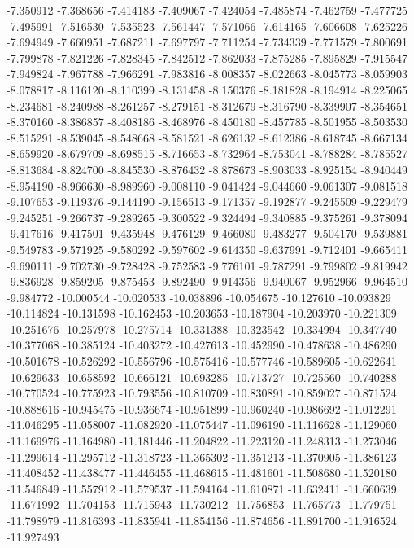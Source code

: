 -7.350912
-7.368656
-7.414183
-7.409067
-7.424054
-7.485874
-7.462759
-7.477725
-7.495991
-7.516530
-7.535523
-7.561447
-7.571066
-7.614165
-7.606608
-7.625226
-7.694949
-7.660951
-7.687211
-7.697797
-7.711254
-7.734339
-7.771579
-7.800691
-7.799878
-7.821226
-7.828345
-7.842512
-7.862033
-7.875285
-7.895829
-7.915547
-7.949824
-7.967788
-7.966291
-7.983816
-8.008357
-8.022663
-8.045773
-8.059903
-8.078817
-8.116120
-8.110399
-8.131458
-8.150376
-8.181828
-8.194914
-8.225065
-8.234681
-8.240988
-8.261257
-8.279151
-8.312679
-8.316790
-8.339907
-8.354651
-8.370160
-8.386857
-8.408186
-8.468976
-8.450180
-8.457785
-8.501955
-8.503530
-8.515291
-8.539045
-8.548668
-8.581521
-8.626132
-8.612386
-8.618745
-8.667134
-8.659920
-8.679709
-8.698515
-8.716653
-8.732964
-8.753041
-8.788284
-8.785527
-8.813684
-8.824700
-8.845530
-8.876432
-8.878673
-8.903033
-8.925154
-8.940449
-8.954190
-8.966630
-8.989960
-9.008110
-9.041424
-9.044660
-9.061307
-9.081518
-9.107653
-9.119376
-9.144190
-9.156513
-9.171357
-9.192877
-9.245509
-9.229479
-9.245251
-9.266737
-9.289265
-9.300522
-9.324494
-9.340885
-9.375261
-9.378094
-9.417616
-9.417501
-9.435948
-9.476129
-9.466080
-9.483277
-9.504170
-9.539881
-9.549783
-9.571925
-9.580292
-9.597602
-9.614350
-9.637991
-9.712401
-9.665411
-9.690111
-9.702730
-9.728428
-9.752583
-9.776101
-9.787291
-9.799802
-9.819942
-9.836928
-9.859205
-9.875453
-9.892490
-9.914356
-9.940067
-9.952966
-9.964510
-9.984772
-10.000544
-10.020533
-10.038896
-10.054675
-10.127610
-10.093829
-10.114824
-10.131598
-10.162453
-10.203653
-10.187904
-10.203970
-10.221309
-10.251676
-10.257978
-10.275714
-10.331388
-10.323542
-10.334994
-10.347740
-10.377068
-10.385124
-10.403272
-10.427613
-10.452990
-10.478638
-10.486290
-10.501678
-10.526292
-10.556796
-10.575416
-10.577746
-10.589605
-10.622641
-10.629633
-10.658592
-10.666121
-10.693285
-10.713727
-10.725560
-10.740288
-10.770524
-10.775923
-10.793556
-10.810709
-10.830891
-10.859027
-10.871524
-10.888616
-10.945475
-10.936674
-10.951899
-10.960240
-10.986692
-11.012291
-11.046295
-11.058007
-11.082920
-11.075447
-11.096190
-11.116628
-11.129060
-11.169976
-11.164980
-11.181446
-11.204822
-11.223120
-11.248313
-11.273046
-11.299614
-11.295712
-11.318723
-11.365302
-11.351213
-11.370905
-11.386123
-11.408452
-11.438477
-11.446455
-11.468615
-11.481601
-11.508680
-11.520180
-11.546849
-11.557912
-11.579537
-11.594164
-11.610871
-11.632411
-11.660639
-11.671992
-11.704153
-11.715943
-11.730212
-11.756853
-11.765773
-11.779751
-11.798979
-11.816393
-11.835941
-11.854156
-11.874656
-11.891700
-11.916524
-11.927493

